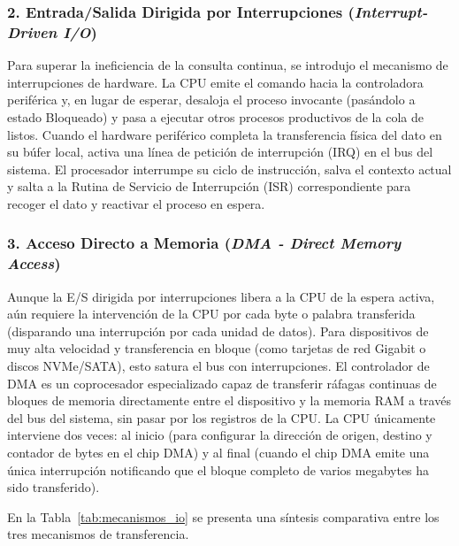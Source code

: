\documentclass[11pt,letterpaper]{article}
\begin{document}
\subsubsection{2. Entrada/Salida Dirigida por Interrupciones (\textit{Interrupt-Driven I/O})}
Para superar la ineficiencia de la consulta continua, se introdujo el mecanismo de interrupciones de hardware. La CPU emite el comando hacia la controladora periférica y, en lugar de esperar, desaloja el proceso invocante (pasándolo a estado Bloqueado) y pasa a ejecutar otros procesos productivos de la cola de listos. Cuando el hardware periférico completa la transferencia física del dato en su búfer local, activa una línea de petición de interrupción (IRQ) en el bus del sistema. El procesador interrumpe su ciclo de instrucción, salva el contexto actual y salta a la Rutina de Servicio de Interrupción (ISR) correspondiente para recoger el dato y reactivar el proceso en espera.

\subsubsection{3. Acceso Directo a Memoria (\textit{DMA - Direct Memory Access})}
Aunque la E/S dirigida por interrupciones libera a la CPU de la espera activa, aún requiere la intervención de la CPU por cada byte o palabra transferida (disparando una interrupción por cada unidad de datos). Para dispositivos de muy alta velocidad y transferencia en bloque (como tarjetas de red Gigabit o discos NVMe/SATA), esto satura el bus con interrupciones. El controlador de DMA es un coprocesador especializado capaz de transferir ráfagas continuas de bloques de memoria directamente entre el dispositivo y la memoria RAM a través del bus del sistema, sin pasar por los registros de la CPU. La CPU únicamente interviene dos veces: al inicio (para configurar la dirección de origen, destino y contador de bytes en el chip DMA) y al final (cuando el chip DMA emite una única interrupción notificando que el bloque completo de varios megabytes ha sido transferido).

En la Tabla~\ref{tab:mecanismos_io} se presenta una síntesis comparativa entre los tres mecanismos de transferencia.
\end{document}

